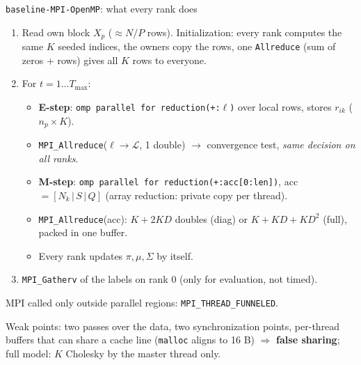 \documentclass[aspectratio=169,10pt]{beamer}
\newcommand{\vbase}{\texttt{baseline-MPI-OpenMP}}
\begin{document}
\begin{frame}{\vbase{}: what every rank does}
\footnotesize
\begin{enumerate}
\item Read own block $X_p$ ($\approx N/P$ rows). Initialization: every rank computes the same $K$ seeded indices, the owners copy the rows, one \texttt{Allreduce} (sum of zeros + rows) gives all $K$ rows to everyone.
\item For $t=1\ldots T_{\max}$:
  \begin{itemize}
  \item \textbf{E-step}: \texttt{omp parallel for reduction(+:$\ell$)} over local rows, stores $r_{ik}$ ($n_p\times K$).
  \item \texttt{MPI\_Allreduce}($\ell\to\mathcal{L}$, 1 double) $\to$ convergence test, \emph{same decision on all ranks}.
  \item \textbf{M-step}: \texttt{omp parallel for reduction(+:acc[0:len])}, acc $=[N_k\,|\,S\,|\,Q]$ (array reduction: private copy per thread).
  \item \texttt{MPI\_Allreduce}(acc): $K+2KD$ doubles (diag) or $K+KD+KD^2$ (full), packed in one buffer.
  \item Every rank updates $\pi,\mu,\Sigma$ by itself.
  \end{itemize}
\item \texttt{MPI\_Gatherv} of the labels on rank 0 (only for evaluation, not timed).
\end{enumerate}
MPI called only outside parallel regions: \texttt{MPI\_THREAD\_FUNNELED}.

\alert{Weak points}: two passes over the data, two synchronization points, per-thread buffers that can share a cache line (\texttt{malloc} aligns to 16 B) $\Rightarrow$ \textbf{false sharing}; full model: $K$ Cholesky by the master thread only.
\end{frame}
\end{document}
